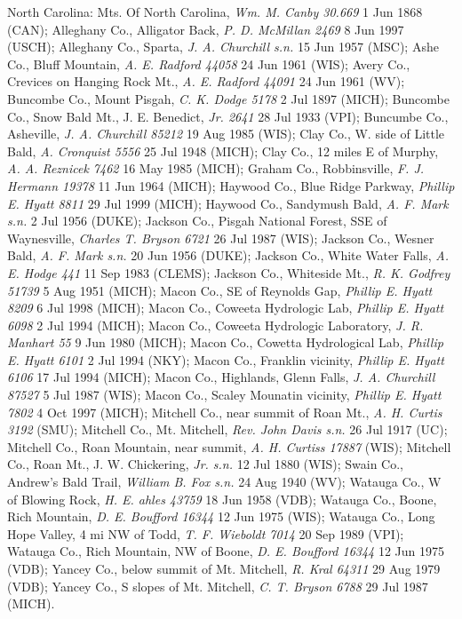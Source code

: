 \documentclass{article}
\begin{document}
North Carolina:
Mts. Of North Carolina, \textit{Wm. M. Canby 30.669} 1 Jun 1868 (CAN);
Alleghany Co., Alligator Back, \textit{P. D. McMillan 2469} 8 Jun 1997 (USCH);
Alleghany Co., Sparta, \textit{J. A. Churchill s.n.} 15 Jun 1957 (MSC);
Ashe Co., Bluff Mountain, \textit{A. E. Radford 44058} 24 Jun 1961 (WIS);
Avery Co., Crevices on Hanging Rock Mt., \textit{A. E. Radford 44091} 24 Jun 1961 (WV);
Buncombe Co., Mount Pisgah, \textit{C. K. Dodge 5178} 2 Jul 1897 (MICH);
Buncombe Co., Snow Bald Mt., J. E. Benedict, \textit{Jr. 2641} 28 Jul 1933 (VPI);
Buncumbe Co., Asheville, \textit{J. A. Churchill 85212} 19 Aug 1985 (WIS);
Clay Co., W. side of Little Bald, \textit{A. Cronquist 5556} 25 Jul 1948 (MICH);
Clay Co., 12 miles E of Murphy, \textit{ A. A. Reznicek 7462} 16 May 1985 (MICH);
Graham Co., Robbinsville, \textit{F. J. Hermann 19378} 11 Jun 1964 (MICH);
Haywood Co., Blue Ridge Parkway, \textit{Phillip E. Hyatt 8811} 29 Jul 1999 (MICH);
Haywood Co., Sandymush Bald, \textit{A. F. Mark s.n.} 2 Jul 1956 (DUKE);
Jackson Co., Pisgah National Forest, SSE of Waynesville, \textit{ Charles T. Bryson 6721} 26 Jul 1987 (WIS);
Jackson Co., Wesner Bald, \textit{A. F. Mark s.n.} 20 Jun 1956 (DUKE);
Jackson Co., White Water Falls, \textit{A. E. Hodge 441} 11 Sep 1983 (CLEMS);
Jackson Co., Whiteside Mt., \textit{R. K. Godfrey 51739} 5 Aug 1951 (MICH);
Macon Co., SE of Reynolds Gap, \textit{Phillip E. Hyatt 8209} 6 Jul 1998 (MICH);
Macon Co., Coweeta Hydrologic Lab, \textit{Phillip E. Hyatt 6098} 2 Jul 1994 (MICH);
Macon Co., Coweeta Hydrologic Laboratory, \textit{J. R. Manhart 55} 9 Jun 1980 (MICH);
Macon Co., Cowetta Hydrological Lab, \textit{Phillip E. Hyatt 6101} 2 Jul 1994 (NKY);
Macon Co., Franklin vicinity, \textit{Phillip E. Hyatt 6106} 17 Jul 1994 (MICH);
Macon Co., Highlands, Glenn Falls, \textit{J. A. Churchill 87527} 5 Jul 1987 (WIS);
Macon Co., Scaley Mounatin vicinity, \textit{Phillip E. Hyatt 7802} 4 Oct 1997 (MICH);
Mitchell Co., near summit of Roan Mt., \textit{A. H. Curtis 3192} (SMU);
Mitchell Co., Mt. Mitchell, \textit{Rev. John Davis s.n.} 26 Jul 1917 (UC);
Mitchell Co., Roan Mountain, near summit, \textit{A. H. Curtiss 17887} (WIS);
Mitchell Co., Roan Mt., J. W. Chickering, \textit{Jr. s.n.} 12 Jul 1880 (WIS);
Swain Co., Andrew's Bald Trail, \textit{William B. Fox s.n.} 24 Aug 1940 (WV);
Watauga Co., W of Blowing Rock, \textit{H. E. ahles 43759} 18 Jun 1958 (VDB);
Watauga Co., Boone, Rich Mountain, \textit{D. E. Boufford 16344} 12 Jun 1975 (WIS);
Watauga Co., Long Hope Valley, 4 mi NW of Todd, \textit{T. F. Wieboldt 7014} 20 Sep 1989 (VPI);
Watauga Co., Rich Mountain, NW of Boone, \textit{ D. E. Boufford 16344} 12 Jun 1975 (VDB);
Yancey Co., below summit of Mt. Mitchell, \textit{R. Kral 64311} 29 Aug 1979 (VDB);
Yancey Co., S slopes of Mt. Mitchell, \textit{C. T. Bryson 6788} 29 Jul 1987 (MICH).
\end{document}
